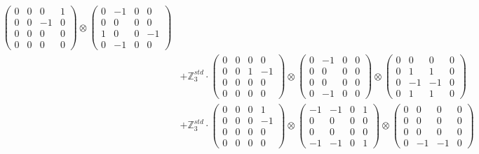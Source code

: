 \documentclass{article}
\begin{document}
{\begin{align}
            \begin{pmatrix} 0 & 0 & 0 & 1 \\ 0 & 0 & -1 & 0 \\ 0 & 0 & 0 & 0 \\ 0 & 0 & 0 & 0 \end{pmatrix} \otimes 
            \begin{pmatrix} 0 & -1 & 0 & 0 \\ 0 & 0 & 0 & 0 \\ 1 & 0 & 0 & -1 \\ 0 & -1 & 0 & 0 \end{pmatrix} \\ 
        &+ \label{Rs16-Rc11-Solution-8-c20} \mathbb{Z}_3^{std} \cdot 
            \begin{pmatrix} 0 & 0 & 0 & 0 \\ 0 & 0 & 1 & -1 \\ 0 & 0 & 0 & 0 \\ 0 & 0 & 0 & 0 \end{pmatrix} \otimes 
            \begin{pmatrix} 0 & -1 & 0 & 0 \\ 0 & 0 & 0 & 0 \\ 0 & 0 & 0 & 0 \\ 0 & -1 & 0 & 0 \end{pmatrix} \otimes 
            \begin{pmatrix} 0 & 0 & 0 & 0 \\ 0 & 1 & 1 & 0 \\ 0 & -1 & -1 & 0 \\ 0 & 1 & 1 & 0 \end{pmatrix} \\ 
        &+ \label{Rs16-Rc11-Solution-8-c21} \mathbb{Z}_3^{std} \cdot 
            \begin{pmatrix} 0 & 0 & 0 & 1 \\ 0 & 0 & 0 & -1 \\ 0 & 0 & 0 & 0 \\ 0 & 0 & 0 & 0 \end{pmatrix} \otimes 
            \begin{pmatrix} -1 & -1 & 0 & 1 \\ 0 & 0 & 0 & 0 \\ 0 & 0 & 0 & 0 \\ -1 & -1 & 0 & 1 \end{pmatrix} \otimes 
            \begin{pmatrix} 0 & 0 & 0 & 0 \\ 0 & 0 & 0 & 0 \\ 0 & 0 & 0 & 0 \\ 0 & -1 & -1 & 0 \end{pmatrix} \\ 

\end{align}}
\end{document}
